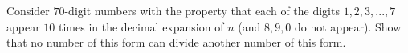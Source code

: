 Consider $70$-digit numbers with the property that each of the digits $1,2,3,...,7$ appear $10$ times in the decimal expansion of $n$ (and $8,9,0$ do not appear). Show that no number of this form can divide another number of this form.